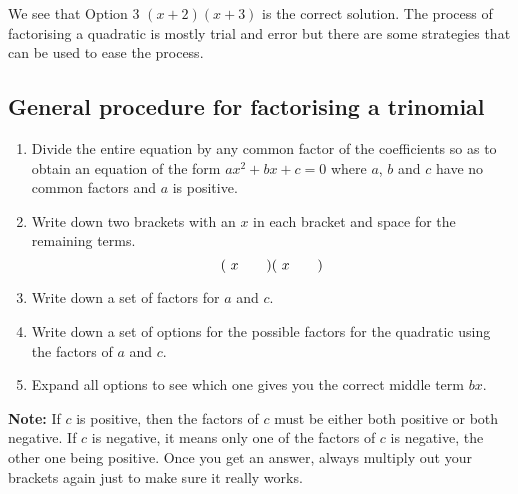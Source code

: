 \par
We see that Option 3 $(x+2)(x+3)$ is the correct solution. The process of factorising a quadratic is mostly trial and error but there are some strategies that can be used to ease the process.\par 



\subsection*{General procedure for factorising a trinomial}

\begin{enumerate}[itemsep=5pt, label=\textbf{\arabic*}. ] 
\item Divide the entire equation by any common factor of the coefficients so as to obtain an equation of the form $a{x}^{2}+bx+c=0$ where $a$, $b$ and $c$ have no common factors and $a$ is positive.
\item Write down two brackets with an $x$ in each bracket and space for the remaining terms.
\begin{equation*}
(\ x\phantom{\rule{2.em}{0ex}})(\ x\phantom{\rule{2.em}{0ex}})
\end{equation*}

\item Write down a set of factors for $a$ and $c$.
\item Write down a set of options for the possible factors for the quadratic using the factors of $a$ and $c$.
\item Expand all options to see which one gives you the correct middle term $bx$.
\end{enumerate}

\par
\textbf{Note:} If $c$ is positive, then the factors of $c$ must be either both positive or both negative. If $c$ is negative, it means only one of the factors of $c$ is negative, the other one being positive.
Once you get an answer, always multiply out your brackets again just to make sure it really works.

